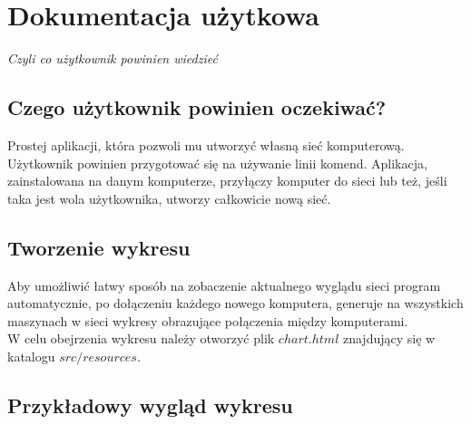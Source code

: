 \section{Dokumentacja użytkowa}

\begin{center}
\textit{Czyli co użytkownik powinien wiedzieć}
\end{center}



\subsection{Czego użytkownik powinien oczekiwać?}
Prostej aplikacji, która pozwoli mu utworzyć własną sieć komputerową. Użytkownik powinien przygotować się na używanie linii komend. Aplikacja, zainstalowana na danym komputerze, przyłączy komputer do sieci lub też, jeśli taka jest wola użytkownika, utworzy całkowicie nową sieć.

\subsection{Tworzenie wykresu}
Aby umożliwić łatwy sposób na zobaczenie aktualnego wyglądu sieci program automatycznie, po dołączeniu każdego nowego komputera, generuje na wszystkich maszynach w sieci wykresy obrazujące połączenia między komputerami.\\
\indent W celu obejrzenia wykresu należy otworzyć plik $chart.html$ znajdujący się w katalogu $src/resources$.

\subsection{Przykładowy wygląd wykresu}

